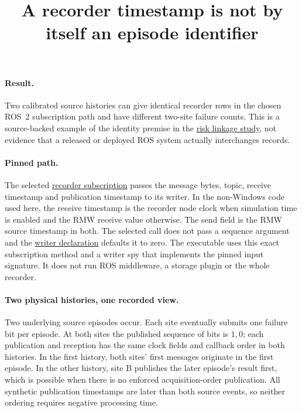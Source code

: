 \documentclass{article}
\title{A recorder timestamp is not by itself an episode identifier}
\begin{document}
\maketitle

\paragraph{Result.}
Two calibrated source histories can give identical recorder rows in
the chosen ROS~2 subscription path and have different two-site failure
counts. This is a source-backed example of the identity premise
in the \href{../episode-linkage/Risk_From_Unlinked_Episodes.tex}{risk
linkage study}, not evidence that a released or deployed ROS system
actually interchanges records.

\paragraph{Pinned path.}
The selected \href{https://github.com/ros2/rosbag2/blob/eaf9712a2b23105eac104d64a6938a40cc5d5c74/rosbag2_transport/src/rosbag2_transport/recorder.cpp}{recorder
subscription} passes the message bytes, topic, receive timestamp
and publication timestamp to its writer. In the non-Windows code
used here, the receive timestamp is the recorder node clock when
simulation time is enabled and the RMW receive value otherwise.
The send field is the RMW source timestamp in both. The selected call
does not pass a sequence argument and the
\href{https://github.com/ros2/rosbag2/blob/eaf9712a2b23105eac104d64a6938a40cc5d5c74/rosbag2_cpp/include/rosbag2_cpp/writer.hpp}{writer declaration}
defaults it to zero. The executable uses this exact subscription
method and a writer spy that implements the pinned input signature.
It does not run ROS middleware, a storage plugin or the whole recorder.

\paragraph{Two physical histories, one recorded view.}
Two underlying source episodes occur. Each site eventually submits
one failure bit per episode. At both sites the published sequence of
bits is \(1,0\); each publication and reception has the same clock
fields and callback order in both histories. In the first history,
both sites' first messages originate in the first episode.
In the other history, site B publishes the later episode's result
first, which is possible when there is no enforced acquisition-order
publication. All synthetic publication timestamps are later than both
source events, so neither ordering requires negative processing time.
\end{document}
